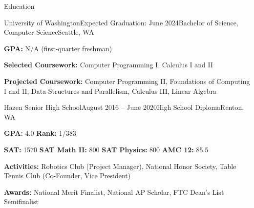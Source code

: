 \documentclass{resume} %
\begin{document}
\begin{rSection}{Education}

\begin{rSubsection}{University of Washington}{Expected Graduation: June 2024}{Bachelor of Science, Computer Science}{Seattle, WA}
\item {\bf GPA:} N/A (first-quarter freshman)
\item {\bf Selected Coursework:} Computer Programming I, Calculus I and II
\item {\bf Projected Coursework:} Computer Programming II, Foundations of Computing I and II, Data Structures and Parallelism, Calculus III, Linear Algebra
\end{rSubsection}

\begin{rSubsection}{Hazen Senior High School}{August 2016 – June 2020}{High School Diploma}{Renton, WA}
\item {\bf GPA:} 4.0 {\bf Rank:} 1/383
\item {\bf SAT:} 1570 {\bf SAT Math II:} 800 {\bf SAT Physics:} 800 {\bf AMC 12:} 85.5
\item {\bf Activities:} Robotics Club (Project Manager), National Honor Society, Table Tennis Club (Co-Founder, Vice President)
\item {\bf Awards:} National Merit Finalist, National AP Scholar, FTC Dean's List Semifinalist
\end{rSubsection}

\end{rSection}

\end{document}
